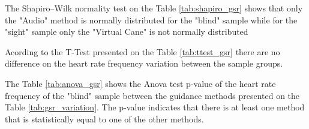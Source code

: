 
%
%    
%
%
%
%
%    
%
The Shapiro–Wilk normality test on the Table \ref{tab:shapiro_gsr} shows that only the "Audio" method is normally distributed for the "blind" sample while for the "sight" sample only the "Virtual Cane" is not normally distributed

%

Acording to the T-Test presented on the Table \ref{tab:ttest_gsr} there are no difference on the heart rate frequency variation between the sample groups.

%

\begin{table}[!htb]
    \begin{minipage}{.45\linewidth}
        
    \end{minipage}
    \hfill
    \begin{minipage}{.45\linewidth}
        \vspace{-2.75cm}
        
    \end{minipage}
\end{table}

The Table \ref{tab:anova_gsr} shows the Anova test p-value of the heart rate frequency of the "blind" sample between the guidance methods presented on the Table \ref{tab:gsr_variation}. The p-value indicates that there is at least one method that is statistically equal to one of the other methods.

